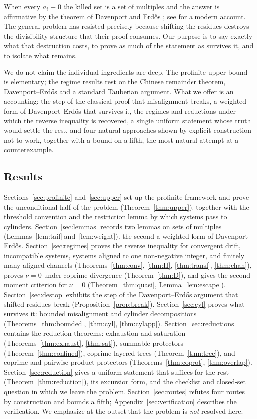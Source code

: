 \documentclass[11pt]{article}
\theoremstyle{plain}
\theoremstyle{definition}
\begin{document}
When every $a_i\equiv0$ the killed set is a set of multiples and
the answer is affirmative by the theorem of Davenport and
Erd\H{o}s \cite{DE1936,DE1951}; see \cite{Hall} for a modern
account.  The general problem has resisted precisely because
shifting the residues destroys the divisibility structure that
their proof consumes.  Our purpose is to say exactly what that
destruction costs, to prove as much of the statement as survives
it, and to isolate what remains.

We do not claim the individual ingredients are deep.  The
profinite upper bound is elementary; the regime results rest on
the Chinese remainder theorem, Davenport--Erd\H{o}s and a
standard Tauberian argument.  What we offer is an
accounting: the step of the classical proof that misalignment
breaks, a weighted form of Davenport--Erd\H{o}s that survives
it, the regimes and reductions under which the reverse
inequality is recovered, a single uniform statement whose truth would settle the
rest, and four natural approaches shown by
explicit construction not to work, together with a bound on a
fifth, the most natural attempt at a counterexample.

\subsection*{Results}
Sections~\ref{sec:profinite} and~\ref{sec:upper} set up the
profinite framework and prove the unconditional half of the
problem (Theorem~\ref{thm:upper}), together with the threshold
convention and the restriction lemma by which systems pass to
cylinders.  Section~\ref{sec:lemmas} records two lemmas on sets
of multiples (Lemmas~\ref{lem:tail} and~\ref{lem:weight}), the
second a weighted form of Davenport--Erd\H{o}s.
Section~\ref{sec:regimes} proves the reverse inequality for
convergent drift, incompatible systems, systems aligned to one
non-negative integer, and finitely many aligned channels (Theorems~\ref{thm:conv},
\ref{thm:H}, \ref{thm:transl}, \ref{thm:chan}), proves $\nu=0$
under coprime divergence (Theorem~\ref{thm:D}), and gives the
second-moment criterion for $\nu=0$ (Theorem~\ref{thm:quasi},
Lemma~\ref{lem:escape}).  Section~\ref{sec:destop} exhibits the
step of the Davenport--Erd\H{o}s argument that shifted residues
break (Proposition~\ref{prop:break}).  Section~\ref{sec:cyl}
proves what survives it: bounded misalignment and cylinder
decompositions (Theorems~\ref{thm:bounded}, \ref{thm:cyl},
\ref{thm:cylapp}).  Section~\ref{sec:reductions} contains the
reduction theorems: exhaustion and saturation
(Theorems~\ref{thm:exhaust}, \ref{thm:sat}), summable protectors
(Theorem~\ref{thm:confined}), coprime-layered trees
(Theorem~\ref{thm:tree}), and coprime and pairwise-product
protectors (Theorems~\ref{thm:coprot}, \ref{thm:overlap}).
Section~\ref{sec:reduction} gives a uniform statement that
suffices for the rest (Theorem~\ref{thm:reduction}), its
excursion form, and the checklist and closed-set question in
which we leave the problem.  Section~\ref{sec:routes} refutes
four routes by construction and bounds a fifth;
Appendix~\ref{sec:verification} describes the verification.  We emphasize at the
outset that the problem is \emph{not} resolved here.
\end{document}
